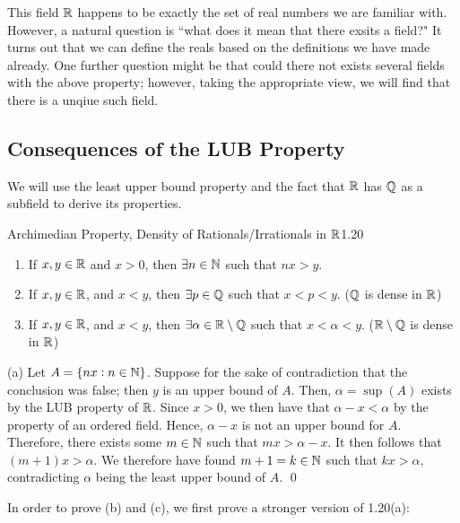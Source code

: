 This field $\mathbb{R}$ happens to be exactly the set of real numbers we are familiar with. However, a natural question is ``what does it mean that there exsits a field?" It turns out that we can define the reals based on the definitions we have made already. One further question might be that could there not exists several fields with the above property; however, taking the appropriate view, we will find that there is a unqiue such field. 

\subsection{Consequences of the LUB Property}
We will use the least upper bound property and the fact that $\mathbb{R}$ has $\mathbb{Q}$ as a subfield to derive its properties.
\begin{theorem}{Archimedian Property, Density of Rationals/Irrationals in $\mathbb{R}$}{1.20}
    \begin{enumerate}
        \item If $x, y \in \mathbb{R}$ and $x > 0$, then $\exists n \in \mathbb{N}$ such that $nx > y$.
        \item If $x, y \in \mathbb{R}$, and $x < y$, then $\exists p \in \mathbb{Q}$ such that $x < p < y$. ($\mathbb{Q}$ is dense in $\mathbb{R}$)
        \item If $x, y \in \mathbb{R}$, and $x < y$, then $\exists \alpha \in \mathbb{R} \setminus \mathbb{Q}$ such that $x < \alpha < y$. ($\mathbb{R}\setminus\mathbb{Q}$ is dense in $\mathbb{R}$)
    \end{enumerate}
\end{theorem}

\begin{nproof}
    (a) Let $A = \set{nx: n \in \mathbb{N}}$. Suppose for the sake of contradiction that the conclusion was false; then $y$ is an upper bound of $A$. Then, $\alpha = \sup(A)$ exists by the LUB property of $\mathbb{R}$. Since $x > 0$, we then have that $\alpha - x < \alpha$ by the property of an ordered field. Hence, $\alpha - x$ is not an upper bound for $A$. Therefore, there exists some $m \in \mathbb{N}$ such that $mx > \alpha - x$. It then follows that $(m+1)x > \alpha$. We therefore have found $m+1 = k \in \mathbb{N}$ such that $kx > \alpha$, contradicting $\alpha$ being the least upper bound of $A$. \qed
\end{nproof}

\noindent In order to prove (b) and (c), we first prove a stronger version of 1.20(a):

